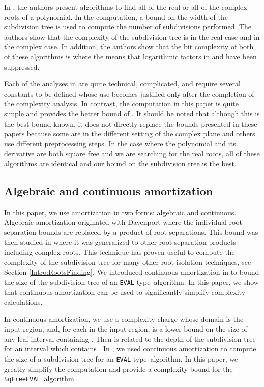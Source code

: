 \documentclass{amsart}
\theoremstyle{definition}
\newcommand{\EVAL}{\texttt{SqFreeEVAL}}
\newcommand{\EVALTYPE}{\texttt{EVAL}-type}
\begin{document}
In \citep{sagraloff-yap:ceval:09}, the authors present algorithms to find all of the real or all of the complex roots of a polynomial.  In the computation, a bound on the width of the subdivision tree is used to compute the number of subdivisions performed.  The authors show that the complexity of the subdivision tree is  in the real case and  in the complex case.  In addition, the authors show that the bit complexity of both of these algorithms is  where the  means that logarithmic factors in  and  have been suppressed.

Each of the analyses in \citep{Yakoubsohn:bisection:05,Burr-Krahmer-Yap:integral:09,sagraloff-yap:ceval:09} are quite technical, complicated, and require several constants to be defined whose use becomes justified only after the completion of the complexity analysis.  In contrast, the computation in this paper is quite simple and provides the better bound of .  It should be noted that although this is the best bound known, it does not directly replace the bounds presented in these papers because some are in the different setting of the complex plane and others use different preprocessing steps.  In the case where the polynomial and its derivative are both square free and we are searching for the real roots, all of these algorithms are identical and our bound on the subdivision tree is the best.

\subsection{Algebraic and continuous amortization}
In this paper, we use amortization in two forms: algebraic and continuous.  Algebraic amortization originated with Davenport \citep{davenport:85} where the individual root separation bounds are replaced by a product of root separations.  This bound was then studied in \citep{du-sharma-yap:sturm:07,eigenwillig-sharma-yap:descartes:06} where it was generalized to other root separation products including complex roots.  This technique has proven useful to compute the complexity of the subdivision tree for many other root isolation techniques, see Section \ref{Intro:RootsFinding}.  We introduced continuous amortization in \citep{Burr-Krahmer-Yap:integral:09} to bound the size of the subdivision tree of an \EVALTYPE\ algorithm.  In this paper, we show that continuous amortization can be used to significantly simplify complexity calculations.

In continuous amortization, we use a complexity charge  whose domain is the input region, and, for each  in the input region,  is a lower bound on the size of any leaf interval containing .  Then  is related to the depth of the subdivision tree for an interval which contains .  In \citep{Burr-Krahmer-Yap:integral:09}, we used continuous amortization to compute the size of a subdivision tree for an \EVALTYPE\ algorithm.  In this paper, we greatly simplify the computation and provide a complexity bound for the \EVAL\ algorithm.
\end{document}
